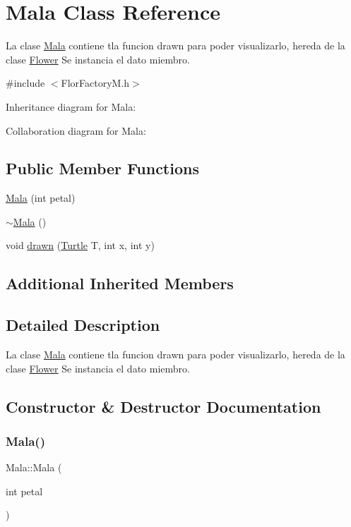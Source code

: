 \hypertarget{classMala}{}\section{Mala Class Reference}
\label{classMala}


La clase \hyperlink{classMala}{Mala} contiene tla funcion drawn para poder visualizarlo, hereda de la clase \hyperlink{classFlower}{Flower}  Se instancia el dato miembro.  




{\ttfamily \#include $<$Flor\+Factory\+M.\+h$>$}



Inheritance diagram for Mala\+:


Collaboration diagram for Mala\+:
\subsection*{Public Member Functions}
\begin{DoxyCompactItemize}
\item 
\hyperlink{classMala_a49ecdf599ca6f86bc24148b6001e9728}{Mala} (int petal)
\item 
\hyperlink{classMala_a4488bbbe9c752a1afa6eead941050a72}{$\sim$\+Mala} ()
\item 
void \hyperlink{classMala_ab62f3d5d10d96d5047b3842e02f160c3}{drawn} (\hyperlink{classTurtle}{Turtle} T, int x, int y)
\end{DoxyCompactItemize}
\subsection*{Additional Inherited Members}


\subsection{Detailed Description}
La clase \hyperlink{classMala}{Mala} contiene tla funcion drawn para poder visualizarlo, hereda de la clase \hyperlink{classFlower}{Flower}  Se instancia el dato miembro. 

\subsection{Constructor \& Destructor Documentation}
\mbox{\label{classMala_a49ecdf599ca6f86bc24148b6001e9728}} 
\subsubsection{\texorpdfstring{Mala()}{Mala()}}
{\footnotesize\ttfamily Mala\+::\+Mala (\begin{DoxyParamCaption}\item[{int}]{petal }\end{DoxyParamCaption})}

